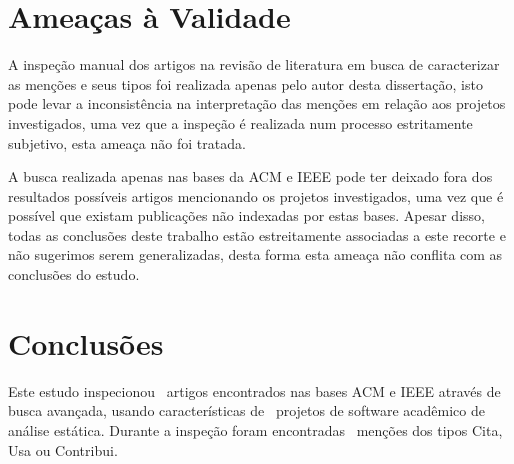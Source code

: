 
\section{Ameaças à Validade}  \label{estudo2:ameacas} %

A inspeção manual dos artigos na revisão de literatura em busca de caracterizar
as menções e seus tipos foi realizada apenas pelo autor desta dissertação, isto
pode levar a inconsistência na interpretação das menções em relação aos projetos
investigados, uma vez que a inspeção é realizada num processo estritamente
subjetivo, esta ameaça não foi tratada.

A busca realizada apenas nas bases da ACM e IEEE pode ter deixado fora dos
resultados possíveis artigos mencionando os projetos investigados, uma vez que
é possível que existam publicações não indexadas por estas bases. Apesar disso,
todas as conclusões deste trabalho estão estreitamente associadas a este recorte e não
sugerimos serem generalizadas, desta forma esta ameaça não conflita com as conclusões
do estudo.



\section{Conclusões} \label{estudo2:conclusoes} %

Este estudo inspecionou \SearchUniqueCount \ artigos encontrados nas bases ACM
e IEEE através de busca avançada, usando características de \SoftwareCount \
projetos de software acadêmico de análise estática. Durante a inspeção foram
encontradas \ScreeningCount \ menções dos tipos Cita, Usa ou
Contribui.

